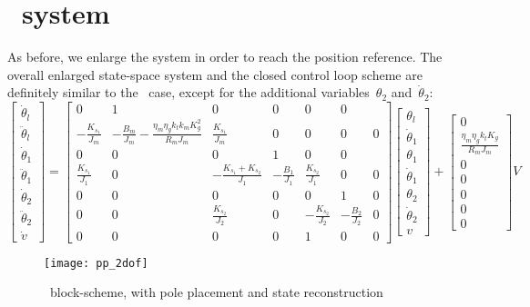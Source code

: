\section{\twodof\ system}
As before, we enlarge the system in order to reach the position reference. The overall enlarged state-space system and the closed control loop scheme are definitely similar to the \onedof\ case, except for the additional variables~$\theta_2$ and~$\dot\theta_2$:
\begin{equation}
	\begin{bmatrix}
		\dot{\theta}_l \\
		\ddot{\theta}_l \\
		\dot{\theta}_1 \\
		\ddot{\theta}_1 \\
		\dot{\theta}_2 \\
		\ddot{\theta}_2 \\
		\dot v
	\end{bmatrix}
	=
	\begin{bmatrix}
		0 &1 & 0 & 0 & 0 & 0 \\
		-\frac{K_{s_1}}{J_m} & -\frac{B_m}{J_m}-\frac{\eta_m \eta_g k_t k_m K^2_g}{R_m J_m}  & \frac{K_{s_1}}{J_m} & 0 & 0 & 0 & 0 \\
		0 & 0 & 0 & 1 & 0 & 0 \\
		\frac{K_{s_1}}{J_1} & 0 & -\frac{K_{s_1}+K_{s_2}}{J_1} & -\frac{B_1}{J_1} & \frac{K_{s_2}}{J_1} & 0 & 0 \\
		0 & 0 & 0 & 0 & 0 & 1 & 0 \\
		0 & 0 & \frac{K_{s_2}}{J_2} & 0 & -\frac{K_{s_2}}{J_2} & -\frac{B_2}{J_2} & 0 \\
		0 & 0 & 0 & 0 & 1 & 0 & 0
	\end{bmatrix}
	\begin{bmatrix}
		\theta_l \\
		\dot{\theta}_1 \\
		\theta_1 \\
		\dot{\theta}_1 \\
		\theta_2 \\
		\dot{\theta}_2 \\
		v
	\end{bmatrix}
	+
	\begin{bmatrix}
		0 \\
		\frac{\eta_m \eta_g k_t K_g}{R_m J_m} \\
		0 \\
		0 \\
		0 \\
		0 \\
		0
	\end{bmatrix}
	V
\end{equation}
\begin{figure*}[h]
	\centering
	\texttt{[image: pp\_2dof]}
	\caption{\twodof\ block-scheme, with pole placement and state reconstruction}
\end{figure*}

